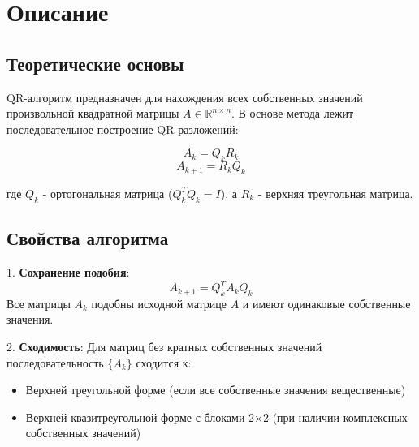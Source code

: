 
\section*{Описание}

\subsection*{Теоретические основы}
QR-алгоритм предназначен для нахождения всех собственных значений произвольной квадратной матрицы $A \in \mathbb{R}^{n \times n}$. В основе метода лежит последовательное построение QR-разложений:

\begin{equation}
A_k = Q_k R_k
\end{equation}
\begin{equation}
A_{k+1} = R_k Q_k
\end{equation}

где $Q_k$ - ортогональная матрица ($Q_k^T Q_k = I$), а $R_k$ - верхняя треугольная матрица.

\subsection*{Свойства алгоритма}
1. \textbf{Сохранение подобия}:
\begin{equation}
A_{k+1} = Q_k^T A_k Q_k
\end{equation}
Все матрицы $A_k$ подобны исходной матрице $A$ и имеют одинаковые собственные значения.

2. \textbf{Сходимость}:
Для матриц без кратных собственных значений последовательность $\{A_k\}$ сходится к:
\begin{itemize}
\item Верхней треугольной форме (если все собственные значения вещественные)
\item Верхней квазитреугольной форме с блоками 2×2 (при наличии комплексных собственных значений)
\end{itemize}

